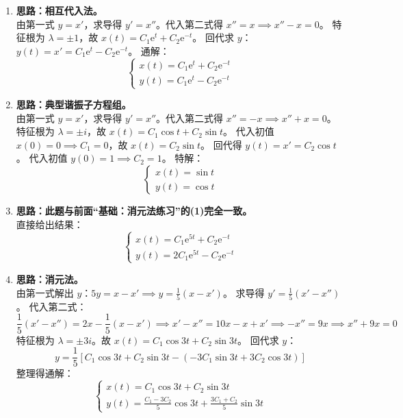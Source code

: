 \documentclass[lang=cn,11pt]{elegantbook}
\begin{document}
\begin{solution}
\begin{enumerate}
    \item[(1)] \textbf{思路：相互代入法。}\\
    由第一式 $y = x'$，求导得 $y' = x''$。代入第二式得 $x'' = x \implies x'' - x = 0$。
    特征根为 $\lambda = \pm 1$，故 $x(t) = C_1\mathrm{e}^t + C_2\mathrm{e}^{-t}$。
    回代求 $y$：$y(t) = x' = C_1\mathrm{e}^t - C_2\mathrm{e}^{-t}$。
    通解：
    \[
    \begin{cases} x(t) = C_1\mathrm{e}^t + C_2\mathrm{e}^{-t} \\ y(t) = C_1\mathrm{e}^t - C_2\mathrm{e}^{-t} \end{cases}
    \]

    \item[(2)] \textbf{思路：典型谐振子方程组。}\\
    由第一式 $y = x'$，求导得 $y' = x''$。代入第二式得 $x'' = -x \implies x'' + x = 0$。
    特征根为 $\lambda = \pm i$，故 $x(t) = C_1\cos t + C_2\sin t$。
    代入初值 $x(0) = 0 \implies C_1 = 0$，故 $x(t) = C_2\sin t$。
    回代得 $y(t) = x' = C_2\cos t$。
    代入初值 $y(0) = 1 \implies C_2 = 1$。
    特解：
    \[
    \begin{cases} x(t) = \sin t \\ y(t) = \cos t \end{cases}
    \]

    \item[(3)] \textbf{思路：此题与前面“基础：消元法练习”的(1)完全一致。}\\
    直接给出结果：
    \[
    \begin{cases}
    x(t) = C_1\mathrm{e}^{5t} + C_2\mathrm{e}^{-t} \\
    y(t) = 2C_1\mathrm{e}^{5t} - C_2\mathrm{e}^{-t}
    \end{cases}
    \]

    \item[(4)] \textbf{思路：消元法。}\\
    由第一式解出 $y$：$5y = x - x' \implies y = \frac{1}{5}(x - x')$。
    求导得 $y' = \frac{1}{5}(x' - x'')$。
    代入第二式：
    \[
    \frac{1}{5}(x' - x'') = 2x - \frac{1}{5}(x - x') \implies x' - x'' = 10x - x + x' \implies -x'' = 9x \implies x'' + 9x = 0
    \]
    特征根为 $\lambda = \pm 3i$。故 $x(t) = C_1\cos 3t + C_2\sin 3t$。
    回代求 $y$：
    \[
    y = \frac{1}{5}\left[ C_1\cos 3t + C_2\sin 3t - (-3C_1\sin 3t + 3C_2\cos 3t) \right]
    \]
    整理得通解：
    \[
    \begin{cases}
    x(t) = C_1\cos 3t + C_2\sin 3t \\
    y(t) = \frac{C_1-3C_2}{5}\cos 3t + \frac{3C_1+C_2}{5}\sin 3t
    \end{cases}
    \]
\end{enumerate}
\end{solution}
\end{document}
